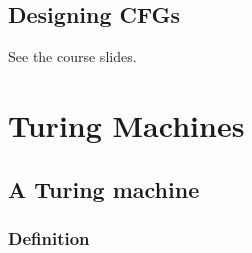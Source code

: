 \documentclass[12pt, letterpaper, oneside]{book}
\begin{document}
\section{Designing CFGs}

See the course slides.

%
%

\chapter{Turing Machines}

\section{A Turing machine}

\subsection{Definition}
\end{document}
